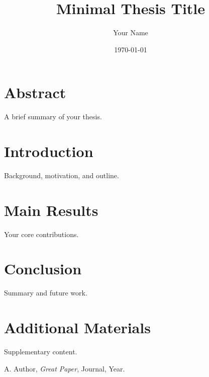 \documentclass[twoside]{report}
\title{Minimal Thesis Title}
\author{Your Name}
\date{\today}
\begin{document}
\maketitle
\tableofcontents

\chapter*{Abstract}
A brief summary of your thesis.

\chapter{Introduction}
Background, motivation, and outline.

\chapter{Main Results}
Your core contributions.

\chapter{Conclusion}
Summary and future work.

\appendix
\chapter{Additional Materials}
Supplementary content.

\begin{thebibliography}{9}
 A. Author, \emph{Great Paper}, Journal, Year.
\end{thebibliography}
\end{document}
